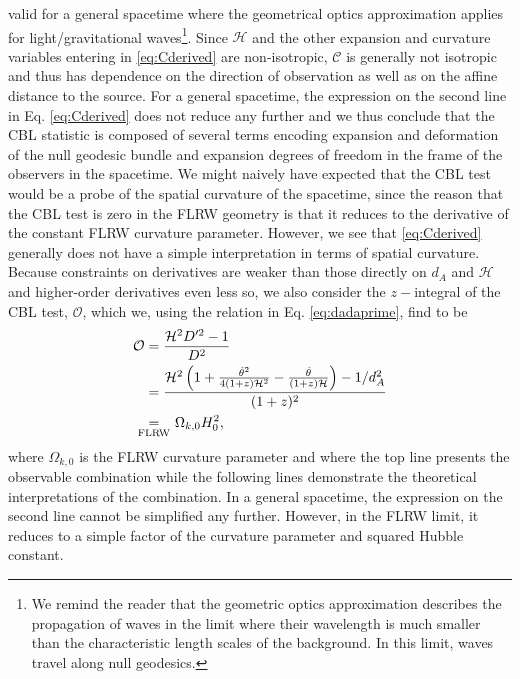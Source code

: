 \documentclass[reprint,aps,prd,nofootinbib,a4paper,10pt,twocolumn,superscriptaddress]{revtex4-2}
\begin{document}
valid for a general spacetime where the geometrical optics approximation applies for light/gravitational waves\footnote{We remind the reader that the geometric optics approximation describes the propagation of waves in the limit where their wavelength is much smaller than the characteristic length scales of the background. In this limit, waves travel along null geodesics.
}.
Since $\mathcal{H}$ and the other expansion and curvature variables entering in \eqref{eq:Cderived} are non-isotropic, $\mathcal{C}$ is generally not isotropic and thus has dependence on the direction of observation as well as on the affine distance to the source.
\newline\indent
For a general spacetime, the expression on the second line in Eq. \eqref{eq:Cderived} does not reduce any further and we thus conclude that the CBL statistic is composed of several terms encoding expansion and deformation of the null geodesic bundle and expansion degrees of freedom in the frame of the observers in the spacetime.
We might naively have expected that the CBL test would be a probe of the spatial curvature of the spacetime, since the reason that the  CBL test is zero in the FLRW geometry is that it reduces to the derivative of the constant FLRW curvature parameter. However, we see that \eqref{eq:Cderived} generally does not have a simple interpretation in terms of spatial curvature.
\newline\newline
Because constraints on derivatives are weaker than those directly on $d_A$ and $\mathcal{H}$ and higher-order derivatives even less so, we also consider the $z-$integral of the CBL test, $\mathcal{O}$, which we, using the relation in Eq. \ref{eq:dadaprime}, find to be
\begin{align}\label{eq:O}
\begin{split}
    \mathcal{O} &= \frac{\mathcal{H}^2D'^2-1}{D^2} \\&= \frac{\mathcal{H}^2\left( 1+\frac{\hat\theta^2}{4(1+z)\mathcal{H}^2} - \frac{\hat\theta}{(1+z)\mathcal{H}} \right)-1/d_A^2}{(1+z)^2}
    \\&\underset{\mathclap{\text{FLRW}}}{=} \,\,\,\,\,\Omega_{k,0}H_0^2,
\end{split}
\end{align}
where $\Omega_{k,0}$ is the FLRW curvature parameter and where the top line presents the observable combination while the following lines demonstrate the theoretical interpretations of the combination. In a general spacetime, the expression on the second line cannot be simplified any further. However, in the FLRW limit, it reduces to a simple factor of the curvature parameter and squared Hubble constant.
\end{document}
